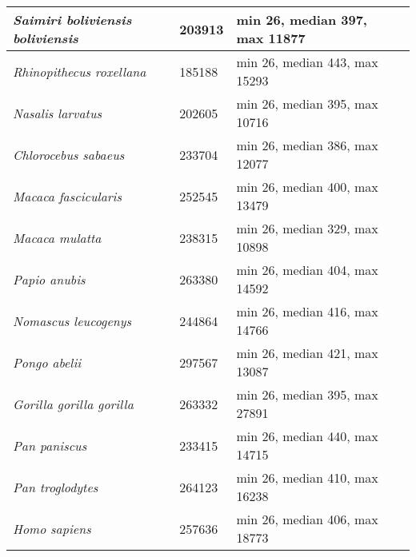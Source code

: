 {\begin{longtable}{| L{4cm} | L{2cm}  | L{5cm} | L{4cm} |}
\textit{Saimiri boliviensis boliviensis} & 203913 & min 26, median 397, max 11877 & \\ \hline
\textit{Rhinopithecus roxellana} & 185188 & min 26, median 443, max 15293 & \\ \hline
\textit{Nasalis larvatus} & 202605 & min 26, median 395, max 10716 & \\ \hline
\textit{Chlorocebus sabaeus} & 233704 & min 26, median 386, max 12077 & \\ \hline
\textit{Macaca fascicularis} & 252545 & min 26, median 400, max 13479 & \\ \hline
\textit{Macaca mulatta} & 238315 & min 26, median 329, max 10898 & \\ \hline
\textit{Papio anubis} & 263380 & min 26, median 404, max 14592 & \\ \hline
\textit{Nomascus leucogenys} & 244864 & min 26, median 416, max 14766 & \\ \hline
\textit{Pongo abelii} & 297567 & min 26, median 421, max 13087 & \\ \hline
\textit{Gorilla gorilla gorilla} & 263332 & min 26, median 395, max 27891 & \\ \hline
\textit{Pan paniscus} & 233415 & min 26, median 440, max 14715 & \\ \hline
\textit{Pan troglodytes} & 264123 & min 26, median 410, max 16238 & \\ \hline
\textit{Homo sapiens} & 257636 & min 26, median 406, max 18773 & \\ \hline


\end{longtable}}
